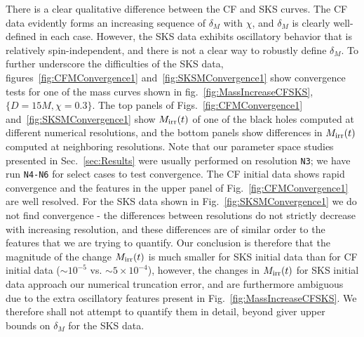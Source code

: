 There is a clear qualitative difference between the CF and SKS
curves. The CF data evidently forms an increasing sequence of
$\delta_M$ with $\chi$, and $\delta_M$ is clearly well-defined in each
case. However, the SKS data exhibits oscillatory behavior that is
relatively spin-independent, and there is not a clear way to robustly
define $\delta_M$. To further underscore the difficulties of the SKS
data, figures~\ref{fig:CFMConvergence1} and~\ref{fig:SKSMConvergence1}
show convergence tests for one of the mass curves shown in
fig.~\ref{fig:MassIncreaseCFSKS}, $\{D=15M,\chi=0.3\}$. The top panels
of Figs.~\ref{fig:CFMConvergence1} and~\ref{fig:SKSMConvergence1} show
$M_{\rm irr}(t)$ of one of the black holes computed at different
numerical resolutions, and the bottom panels show differences in
$M_{\rm irr}(t)$ computed at neighboring resolutions. Note that our
parameter space studies presented in Sec.~\ref{sec:Results} were
usually performed on resolution {\tt N3}; we have run {\tt N4-N6} for
select cases to test convergence. The CF initial data shows rapid
convergence and the features in the upper panel of
Fig.~\ref{fig:CFMConvergence1} are well resolved. For the SKS data
shown in Fig.~\ref{fig:SKSMConvergence1} we do not find convergence -
the differences between resolutions do not strictly decrease with
increasing resolution, and these differences are of similar order to
the features that we are trying to quantify. Our conclusion is
therefore that the magnitude of the change $M_{\rm irr}(t)$ is much
smaller for SKS initial data than for CF initial data ($\sim 10^{-5}$
vs. $\sim 5\times10^{-4}$), however, the changes in $M_{\rm irr}(t)$
for SKS initial data approach our numerical truncation error, and are
furthermore ambiguous due to the extra oscillatory features present in
Fig.~\ref{fig:MassIncreaseCFSKS}. We therefore shall not attempt to
quantify them in detail, beyond giver upper bounds on $\delta_M$ for
the SKS data.

